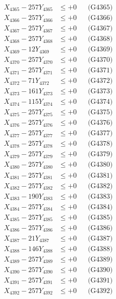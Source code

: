 \documentclass[a4paper,10pt]{article}
\begin{document}
{\begin{align}
X_{4365} - 257Y_{4365} &\leq +0 && \text{(G4365)} \\
X_{4366} - 257Y_{4366} &\leq +0 && \text{(G4366)} \\
X_{4367} - 257Y_{4367} &\leq +0 && \text{(G4367)} \\
X_{4368} - 257Y_{4368} &\leq +0 && \text{(G4368)} \\
X_{4369} - 12Y_{4369} &\leq +0 && \text{(G4369)} \\
X_{4370} - 257Y_{4370} &\leq +0 && \text{(G4370)} \\
\allowbreak
X_{4371} - 257Y_{4371} &\leq +0 && \text{(G4371)} \\
X_{4372} - 71Y_{4372} &\leq +0 && \text{(G4372)} \\
X_{4373} - 161Y_{4373} &\leq +0 && \text{(G4373)} \\
X_{4374} - 115Y_{4374} &\leq +0 && \text{(G4374)} \\
X_{4375} - 257Y_{4375} &\leq +0 && \text{(G4375)} \\
X_{4376} - 257Y_{4376} &\leq +0 && \text{(G4376)} \\
X_{4377} - 257Y_{4377} &\leq +0 && \text{(G4377)} \\
X_{4378} - 257Y_{4378} &\leq +0 && \text{(G4378)} \\
X_{4379} - 257Y_{4379} &\leq +0 && \text{(G4379)} \\
X_{4380} - 257Y_{4380} &\leq +0 && \text{(G4380)} \\
\allowbreak
X_{4381} - 257Y_{4381} &\leq +0 && \text{(G4381)} \\
X_{4382} - 257Y_{4382} &\leq +0 && \text{(G4382)} \\
X_{4383} - 190Y_{4383} &\leq +0 && \text{(G4383)} \\
X_{4384} - 257Y_{4384} &\leq +0 && \text{(G4384)} \\
X_{4385} - 257Y_{4385} &\leq +0 && \text{(G4385)} \\
X_{4386} - 257Y_{4386} &\leq +0 && \text{(G4386)} \\
X_{4387} - 21Y_{4387} &\leq +0 && \text{(G4387)} \\
X_{4388} - 146Y_{4388} &\leq +0 && \text{(G4388)} \\
X_{4389} - 257Y_{4389} &\leq +0 && \text{(G4389)} \\
X_{4390} - 257Y_{4390} &\leq +0 && \text{(G4390)} \\
\allowbreak
X_{4391} - 257Y_{4391} &\leq +0 && \text{(G4391)} \\
X_{4392} - 257Y_{4392} &\leq +0 && \text{(G4392)} \\

\end{align}}
\end{document}
